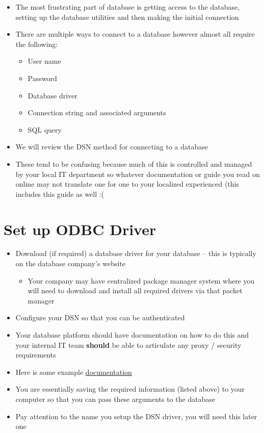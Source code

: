 \documentclass[
  letterpaper,
  DIV=11,
  numbers=noendperiod]{scrreprt}
\providecommand{\tightlist}{%
  \setlength{\itemsep}{0pt}\setlength{\parskip}{0pt}}\usepackage{longtable,booktabs,array}
\begin{document}
\begin{itemize}
\item
  The most frustrating part of database is getting access to the
  database, setting up the database utilities and then making the
  initial connection
\item
  There are multiple ways to connect to a database however almost all
  require the following:

  \begin{itemize}
  \tightlist
  \item
    User name
  \item
    Password
  \item
    Database driver
  \item
    Connection string and associated arguments
  \item
    SQL query
  \end{itemize}
\item
  We will review the DSN method for connecting to a database
\item
  These tend to be confusing because much of this is controlled and
  managed by your local IT department so whatever documentation or guide
  you read on online may not translate one for one to your localized
  experienced (this includes this guide as well :(
\end{itemize}

\section{Set up ODBC Driver}\label{set-up-odbc-driver}

\begin{itemize}
\item
  Download (if required) a database driver for your database -- this is
  typically on the database company's website

  \begin{itemize}
  \tightlist
  \item
    Your company may have centralized package manager system where you
    will need to download and install all required drivers via that
    packet manager
  \end{itemize}
\item
  Configure your DSN so that you can be authenticated
\item
  Your database platform should have documentation on how to do this and
  your internal IT team \textbf{should} be able to articulate any proxy
  / security requirements
\item
  Here is some example
  \href{https://docs.snowflake.com/en/developer-guide/odbc/odbc-windows}{documentation}
\item
  You are essentially saving the required information (listed above) to
  your computer so that you can pass these arguments to the database
\item
  Pay attention to the name you setup the DSN driver, you will need this
  later one
\end{itemize}
\end{document}
